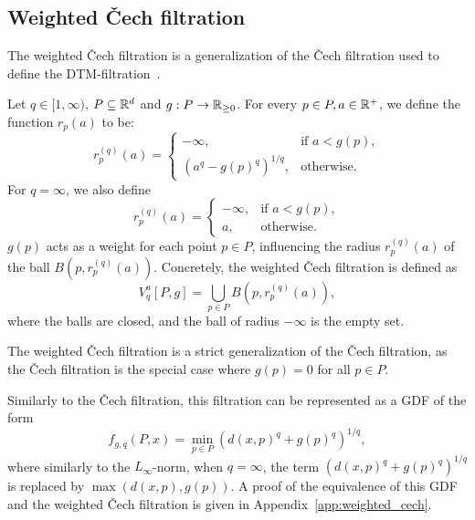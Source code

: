 \subsection{Weighted \v{C}ech filtration}

The weighted \v{C}ech filtration is a generalization of the \v{C}ech filtration
used to define the DTM-filtration~\cite{anai2020dtm}.

\begin{definition}
    Let $q \in [1, \infty)$, $P \subseteq \mathbb{R}^d$ and
    $g : P \to \mathbb{R}_{\geq 0}$. For every $p \in P, a \in \mathbb{R}^+$, we define the
    function $r_p(a)$ to be:
    \begin{equation}
        r_p^{(q)}(a) = \begin{cases}
            - \infty, & \text{if } a < g(p), \\
            (a^q - g(p)^q)^{1/q}, & \text{otherwise}.
        \end{cases}
    \end{equation}
    For $q = \infty$, we also define
    \begin{equation}
        r_p^{(q)}(a) = \begin{cases}
            - \infty, & \text{if } a < g(p), \\
            a, & \text{otherwise}.
        \end{cases}
    \end{equation}
    $g(p)$ acts as a weight for each point $p \in P$, influencing the radius
    $r_p^{(q)}(a)$ of the ball $B(p, r_p^{(q)}(a))$. Concretely, the weighted
    \v{C}ech filtration is defined as
    \begin{equation}
        V^a_q[P, g] = \bigcup_{p \in P} B(p, r_p^{(q)}(a)),
    \end{equation}
    where the balls are closed, and the ball of radius $-\infty$ is the empty
    set.
\end{definition}
The weighted \v{C}ech filtration is a strict generalization of the \v{C}ech
filtration, as the \v{C}ech filtration is the special case where $g(p) = 0$ for
all $p \in P$.

Similarly to the \v{C}ech filtration, this filtration can be represented as a
GDF of the form
\begin{equation}
    f_{g, q}(P, x) = \min_{p \in P} (d(x, p)^{q} + g(p)^{q})^{1/q},
\end{equation}
where similarly to the $L_\infty$-norm, when $q = \infty$, the term
$(d(x, p)^q + g(p)^q)^{1/q}$ is replaced by $\max(d(x, p), g(p))$.
A proof of the equivalence of this GDF and the weighted \v{C}ech filtration is
given in Appendix~\ref{app:weighted_cech}.

